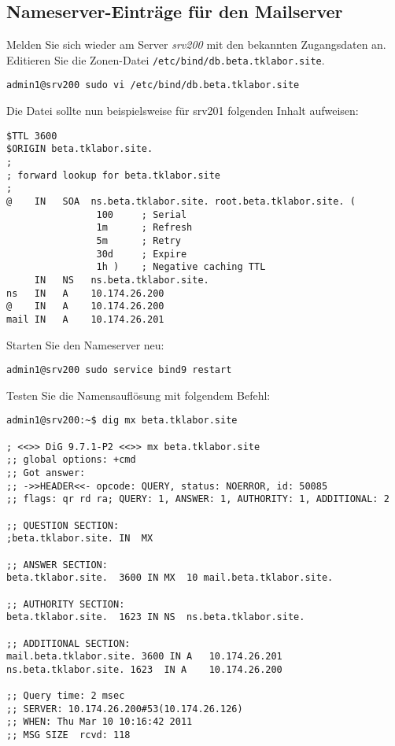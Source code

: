 \subsection{Nameserver-Einträge für den Mailserver}
Melden Sie 
sich wieder am Server \textit{srv200} mit den bekannten Zugangsdaten an.
Editieren Sie die Zonen-Datei \texttt{/etc/bind/db.beta.tklabor.site}.
\begin{lstlisting}
admin1@srv200 sudo vi /etc/bind/db.beta.tklabor.site
\end{lstlisting}
Die Datei sollte nun beispielsweise für srv201 folgenden Inhalt aufweisen:
\begin{scriptsize}
\begin{lstlisting}
$TTL 3600
$ORIGIN beta.tklabor.site.
;
; forward lookup for beta.tklabor.site
;
@    IN   SOA  ns.beta.tklabor.site. root.beta.tklabor.site. ( 
				100		; Serial
				1m		; Refresh
				5m		; Retry
				30d		; Expire
				1h )	; Negative caching TTL
     IN   NS   ns.beta.tklabor.site.
ns   IN   A    10.174.26.200
@    IN   A    10.174.26.200
mail IN   A    10.174.26.201
\end{lstlisting}
\end{scriptsize}
Starten Sie den Nameserver neu:
\begin{lstlisting}
admin1@srv200 sudo service bind9 restart
\end{lstlisting}
Testen Sie die Namensauflösung mit folgendem Befehl:
\begin{scriptsize}
\begin{lstlisting}
admin1@srv200:~$ dig mx beta.tklabor.site

; <<>> DiG 9.7.1-P2 <<>> mx beta.tklabor.site
;; global options: +cmd
;; Got answer:
;; ->>HEADER<<- opcode: QUERY, status: NOERROR, id: 50085
;; flags: qr rd ra; QUERY: 1, ANSWER: 1, AUTHORITY: 1, ADDITIONAL: 2

;; QUESTION SECTION:
;beta.tklabor.site.	IN	MX

;; ANSWER SECTION:
beta.tklabor.site.	3600 IN	MX	10 mail.beta.tklabor.site.

;; AUTHORITY SECTION:
beta.tklabor.site.	1623 IN	NS	ns.beta.tklabor.site.

;; ADDITIONAL SECTION:
mail.beta.tklabor.site. 3600 IN A	10.174.26.201
ns.beta.tklabor.site. 1623	IN A	10.174.26.200

;; Query time: 2 msec
;; SERVER: 10.174.26.200#53(10.174.26.126)
;; WHEN: Thu Mar 10 10:16:42 2011
;; MSG SIZE  rcvd: 118
\end{lstlisting}
\end{scriptsize}

